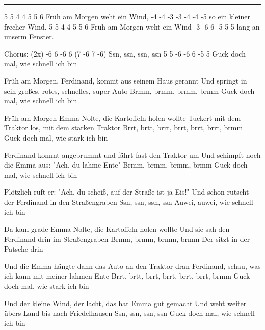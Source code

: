 \documentclass[a4paper,12pt]{article}
\begin{document}
\noindent\rule{\columnwidth}{1pt}
\begin{lstsong}
5    5   4  4    5    5   6 
Früh am Morgen weht ein Wind, 
-4 -4  -3  -3  -4 -4  -5 
so ein kleiner frecher Wind.
5    5   4  4    5    5   6 
Früh am Morgen weht ein Wind
-3  -6  6  -5  5   5 
lang an unserm Fenster.

Chorus: (2x)
-6  6 -6 6    (7 -6 7 -6) 
Ssn, ssn, ssn, ssn
5 5 -6 -6 6 -5 5 
Guck doch mal, wie schnell ich bin

Früh am Morgen, Ferdinand, kommt aus seinem Haus gerannt
Und springt in sein großes, rotes, schnelles, super Auto
Brmm, brmm, brmm, brmm
Guck doch mal, wie schnell ich bin

Früh am Morgen Emma Nolte, die Kartoffeln holen wollte
Tuckert mit dem Traktor los, mit dem starken Traktor
Brrt, brtt, brrt, brrt, brrt, brrt, brmm
Guck doch mal, wie stark ich bin

Ferdinand kommt angebrummt und fährt fast den Traktor um
Und schimpft noch die Emma aus: "Ach, du lahme Ente"
Brmm, brmm, brmm, brmm
Guck doch mal, wie schnell ich bin

Plötzlich ruft er: "Ach, du scheiß, auf der Straße ist ja Eis!"
Und schon rutscht der Ferdinand in den Straßengraben
Ssn, ssn, ssn, ssn
Auwei, auwei, wie schnell ich bin

Da kam grade Emma Nolte, die Kartoffeln holen wollte
Und sie sah den Ferdinand drin im Straßengraben
Brmm, brmm, brmm, brmm
Der sitzt in der Patsche drin

Und die Emma hängte dann das Auto an den Traktor dran
Ferdinand, schau, was ich kann mit meiner lahmen Ente
Brrt, brtt, brrt, brrt, brrt, brrt, brmm
Guck doch mal, wie stark ich bin

Und der kleine Wind, der lacht, das hat Emma gut gemacht
Und weht weiter übers Land bis nach Friedelhausen
Ssn, ssn, ssn, ssn
Guck doch mal, wie schnell ich bin
\end{lstsong}
\newpage
\end{document}
